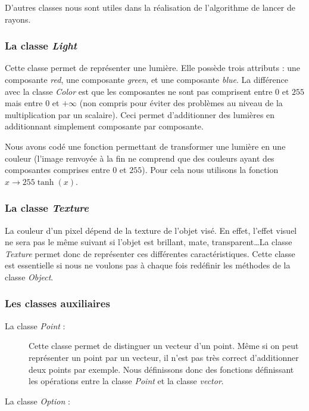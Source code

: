 \documentclass{article}
\begin{document}
D'autres classes nous sont utiles dans la réalisation de l'algorithme de lancer de rayons.

\subsubsection{La classe \emph{Light}}
Cette classe permet de représenter une lumi\`ere. Elle possède trois attributs : une composante \emph{red}, une composante \emph{green}, et une composante \emph{blue}.
La différence avec la classe \emph{Color} est que les composantes ne sont pas comprisent entre $0$ et $255$ mais entre $0$ et $+\infty$ (non compris pour \'eviter des probl\`emes au niveau de la multiplication par un scalaire).
Ceci permet d'additionner des lumières en additionnant simplement composante par composante.


Nous avons codé une fonction permettant de transformer une lumière en une couleur (l'image renvoyée à la fin ne comprend que des couleurs ayant des composantes comprises entre $0$ et $255$). Pour cela nous utilisons la fonction $x \rightarrow 255\tanh(x)$. 

\subsubsection{La classe \emph{Texture}}
	La couleur d'un pixel dépend de la texture de l'objet visé. En effet, l'effet visuel ne sera pas le même suivant si l'objet est brillant, mate, transparent\dots La classe \emph{Texture} permet donc de représenter ces différentes caractéristiques. Cette classe est essentielle si nous ne voulons pas à chaque fois redéfinir les méthodes de la classe \emph{Object}. 

\subsubsection{Les classes auxiliaires}
	\begin{description}
		\item[La classe \emph{Point} : ]
Cette classe permet de distinguer un vecteur d'un point. Même si on peut représenter un point par un vecteur, il n'est pas très correct d'additionner deux points par exemple. Nous définissons donc des fonctions définissant les opérations entre la classe \emph{Point} et la classe \emph{vector}.

		\item[La classe \emph{Option} : ]
	\end{description}
  
\end{document}
